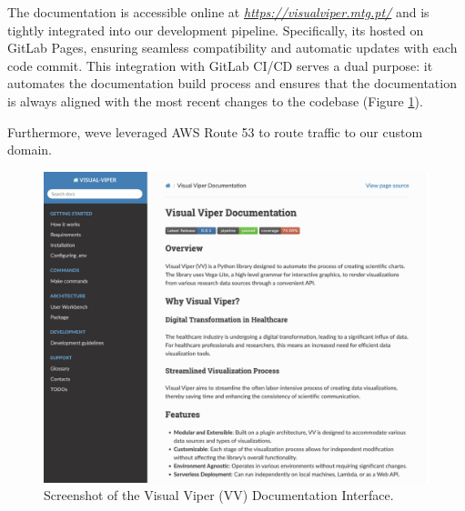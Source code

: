 The documentation is accessible online at \emph{\url{https://visualviper.mtg.pt/}} and is tightly integrated into our development pipeline. Specifically,
it\textquotesingle s hosted on GitLab Pages, ensuring seamless
compatibility and automatic updates with each code commit. This
integration with GitLab CI/CD serves a dual purpose: it automates the
documentation build process and ensures that the documentation is always
aligned with the most recent changes to the codebase (Figure \ref{fig:docs}).

Furthermore, we\textquotesingle ve leveraged AWS Route 53 to route
traffic to our custom domain.

\begin{figure}[ht]
  \centering
  \includegraphics[width=\textwidth]{media/fig7.png}
  \caption{Screenshot of the Visual Viper (VV) Documentation Interface.}
  \label{fig:docs}
\end{figure}
